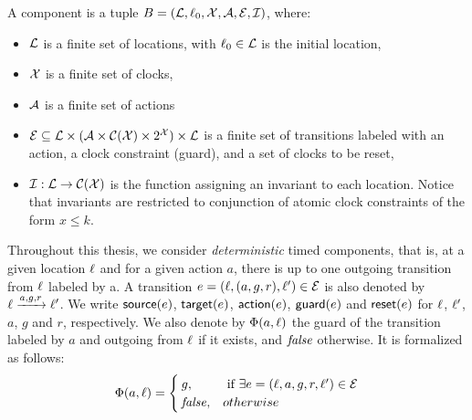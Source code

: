 \begin{definition}\label{def:tc}
  A component is a tuple $B=(\mathcal{L},\ell_0,\mathcal{X},\mathcal{A},\mathcal{E},\mathcal{I})$, where:
  \begin{itemize}
    \item $\mathcal{L}$ is a finite set of locations, with $\ell_0\in\mathcal{L}$ is the 
      initial location,
    \item $\mathcal{X}$ is a finite set of clocks,
    \item $\mathcal{A}$ is a finite set of actions
    \item $\mathcal{E}\subseteq\mathcal{L}\times(\mathcal{A}\times\mathcal{C(X)}\times2^{\mathcal{X}})
      \times\mathcal{L}$ is a finite set of transitions labeled with an action, 
      a clock constraint (guard), and a set of clocks to be reset,
    \item $\mathcal{I}:\mathcal{L}\to\mathcal{C(X)}$ is the function assigning an invariant
      to each location. Notice that invariants are restricted to conjunction
      of atomic clock constraints of the form $x\le k$. 
  \end{itemize}
\end{definition}

Throughout this thesis, we consider 
\emph{deterministic} timed components, that is, at a given location
$\ell$ and for a given action $a$, there is up to one outgoing transition
from $\ell$ labeled by a. 
A transition $e=(\ell,(a,g,r),\ell')\in\mathcal{E}$ is also denoted by
$\ell\xrightarrow{a,g,r}\ell'$. We write $\textsf{source}(e)$, $\textsf{target}(e)$, $\textsf{action}(e)$, $\textsf{guard}(e)$
and $\textsf{reset}(e)$ for $\ell$, $\ell'$, $a$, $g$ and $r$, respectively.
We also denote by $\Phi(a,\ell)$ the guard 
of the transition labeled by $a$ and outgoing from $\ell$
if it exists, and $\textnormal{\textit{false}}$ otherwise. It is formalized as follows:
\[\Phi(a,\ell)=\begin{cases}
  g,& \text{ if } \exists e=(\ell,a,g,r,\ell')\in\mathcal{E}  \\
  \textnormal{\textit{false}},& otherwise
\end{cases}\]

